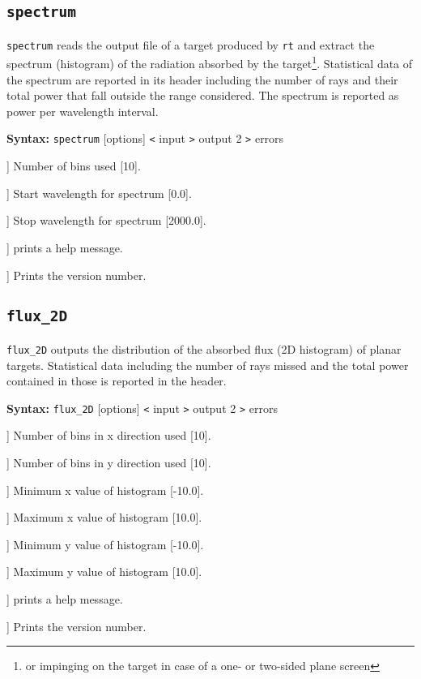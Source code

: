 \documentclass[10pt,a4paper,titlepage]{article}
\newcommand{\rt}{{\tt rt} }
\begin{document}
\subsection{{\tt spectrum}}

{\tt spectrum} reads the output file of a target produced by \rt and extract the spectrum (histogram) of the radiation absorbed by the target\footnote{or impinging on the target in case of a one- or two-sided plane screen}. Statistical data of the spectrum are reported in its header including the number of rays and their total power that fall outside the range considered. The spectrum is reported as power per wavelength interval.

{\bf Syntax:} {\tt spectrum} [options] {\tt <} input {\tt >} output 2 {\tt >} errors
\vspace{1em}
\begin{list}{}
{\setlength{\leftmargin}{3.5cm}
\setlength{\labelwidth}{3.0cm}
\setlength{\rightmargin}{0.5cm}}

\item[\tt [--num|-n]] Number of bins used [10].
\item[\tt [--start|-a]] Start wavelength for spectrum [0.0].
\item[\tt [--stop|-o]] Stop wavelength for spectrum [2000.0].
\item[\tt [--help|-h]] prints a help message.
\item[\tt [--Version|-V]] Prints the version number.

\end{list}

\subsection{{\tt flux\_2D}}
{\tt flux\_2D} outputs the distribution of the absorbed flux (2D histogram) of planar targets. Statistical data including the number of rays missed and the total power contained in those is reported in the header.

{\bf Syntax:} {\tt flux\_2D} [options] {\tt <} input {\tt >} output 2 {\tt >} errors
\vspace{1em}
\begin{list}{}
{\setlength{\leftmargin}{3.5cm}
\setlength{\labelwidth}{3.0cm}
\setlength{\rightmargin}{0.5cm}}

\item[\tt [--nx|-a]] Number of bins in x direction used [10].
\item[\tt [--ny|-b]] Number of bins in y direction used [10].
\item[\tt [--minx|-x]] Minimum x value of histogram [-10.0].
\item[\tt [--maxx|-X]] Maximum x value of histogram [10.0].
\item[\tt [--miny|-y]] Minimum y value of histogram [-10.0].
\item[\tt [--maxy|-Y]] Maximum y value of histogram [10.0].
\item[\tt [--help|-h]] prints a help message.
\item[\tt [--Version|-V]] Prints the version number.

\end{list}
\end{document}
